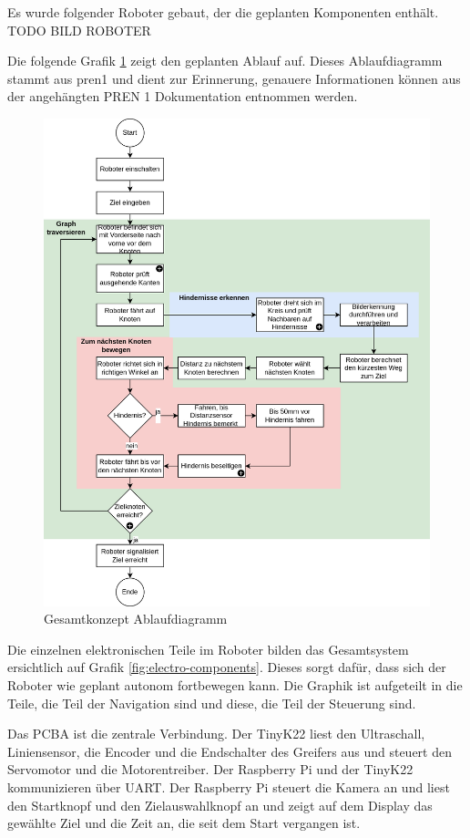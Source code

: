 Es wurde folgender Roboter gebaut, der die geplanten Komponenten enthält.
TODO BILD ROBOTER

Die folgende Grafik \ref{fig:ablauf} zeigt den geplanten Ablauf auf. Dieses Ablaufdiagramm stammt aus \acrshort{pren1} und dient zur Erinnerung, genauere Informationen können aus der angehängten PREN 1 Dokumentation entnommen werden.

\begin{figure}[H]
\centering
\includegraphics[width=\textwidth]{assets/gesamtkonzept/ablaufdiagramm.png}
\caption{Gesamtkonzept Ablaufdiagramm}
\label{fig:ablauf}
\end{figure}


Die einzelnen elektronischen Teile im Roboter bilden das Gesamtsystem ersichtlich auf Grafik \ref{fig:electro-components}. Dieses sorgt dafür, dass sich der Roboter wie geplant autonom fortbewegen kann.  Die Graphik ist aufgeteilt in die Teile, die Teil der Navigation sind und diese, die Teil der Steuerung sind. 

Das PCBA ist die zentrale Verbindung. Der TinyK22 liest den Ultraschall, Liniensensor, die Encoder und die Endschalter des Greifers aus und steuert den Servomotor und die Motorentreiber. Der Raspberry Pi und der TinyK22 kommunizieren über UART. Der Raspberry Pi steuert die Kamera an und liest den Startknopf und den Zielauswahlknopf an und zeigt auf dem Display das gewählte Ziel und die Zeit an, die seit dem Start vergangen ist.

